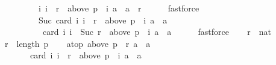 \begin{isabellebody}
\ \ \ \ \ \ \ \ {\isacharequal}{\kern0pt}\ {\isacharbraceleft}{\kern0pt}i{\isachardot}{\kern0pt}\ i\ {\isacharless}{\kern0pt}\ r\ {\isasymand}\ above\ {\isacharparenleft}{\kern0pt}p\ {\isacharbang}{\kern0pt}\ i{\isacharparenright}{\kern0pt}\ a\ {\isacharequal}{\kern0pt}\ {\isacharbraceleft}{\kern0pt}a{\isacharbraceright}{\kern0pt}{\isacharbraceright}{\kern0pt}\ {\isasymunion}\ {\isacharbraceleft}{\kern0pt}r{\isacharbraceright}{\kern0pt}{\isachardoublequoteclose}\isanewline
\ \ \ \ \isamarkupfalse%
\ fastforce\isanewline
\ \ \isamarkupfalse%
\ \isamarkupfalse%
\ \ \ \isanewline
\ \ \ \ \ \ \ \ \ {\isachardoublequoteopen}Suc\ {\isacharparenleft}{\kern0pt}card\ {\isacharbraceleft}{\kern0pt}i{\isachardot}{\kern0pt}\ i\ {\isacharless}{\kern0pt}\ r\ {\isasymand}\ above\ {\isacharparenleft}{\kern0pt}p\ {\isacharbang}{\kern0pt}\ i{\isacharparenright}{\kern0pt}\ a\ {\isacharequal}{\kern0pt}\ {\isacharbraceleft}{\kern0pt}a{\isacharbraceright}{\kern0pt}{\isacharbraceright}{\kern0pt}{\isacharparenright}{\kern0pt}\ {\isacharequal}{\kern0pt}\isanewline
\ \ \ \ \ \ \ \ \ \ card\ {\isacharbraceleft}{\kern0pt}i{\isachardot}{\kern0pt}\ i\ {\isacharless}{\kern0pt}\ Suc\ r\ {\isasymand}\ above\ {\isacharparenleft}{\kern0pt}p\ {\isacharbang}{\kern0pt}\ i{\isacharparenright}{\kern0pt}\ a\ {\isacharequal}{\kern0pt}\ {\isacharbraceleft}{\kern0pt}a{\isacharbraceright}{\kern0pt}{\isacharbraceright}{\kern0pt}{\isachardoublequoteclose}\isanewline
\ \ \ \ \isamarkupfalse%
\ fastforce\isanewline
{}\isamarkupfalse%
\isanewline
\ \ \isamarkupfalse%
\ r\ {\isacharcolon}{\kern0pt}{\isacharcolon}{\kern0pt}\ nat\isanewline
\ \ \isamarkupfalse%
\ {\isachardoublequoteopen}r\ {\isacharless}{\kern0pt}\ length\ p{\isachardoublequoteclose}\isanewline
\ \ \isamarkupfalse%
\ atop{\isacharcolon}{\kern0pt}\ {\isachardoublequoteopen}above\ {\isacharparenleft}{\kern0pt}p\ {\isacharbang}{\kern0pt}\ r{\isacharparenright}{\kern0pt}\ a\ {\isasymnoteq}\ {\isacharbraceleft}{\kern0pt}a{\isacharbraceright}{\kern0pt}{\isachardoublequoteclose}\isanewline
\ \ \isamarkupfalse%
\ \isamarkupfalse%
\ {\isachardoublequoteopen}\isanewline
\ \ \ \ \ \ \ card\ {\isacharbraceleft}{\kern0pt}i{\isachardot}{\kern0pt}\ i\ {\isacharless}{\kern0pt}\ r\ {\isasymand}\ above\ {\isacharparenleft}{\kern0pt}p\ {\isacharbang}{\kern0pt}\ i{\isacharparenright}{\kern0pt}\ a\ {\isacharequal}{\kern0pt}\ {\isacharbraceleft}{\kern0pt}a{\isacharbraceright}{\kern0pt}{\isacharbraceright}{\kern0pt}\ {\isacharequal}{\kern0pt}\isanewline

\end{isabellebody}
